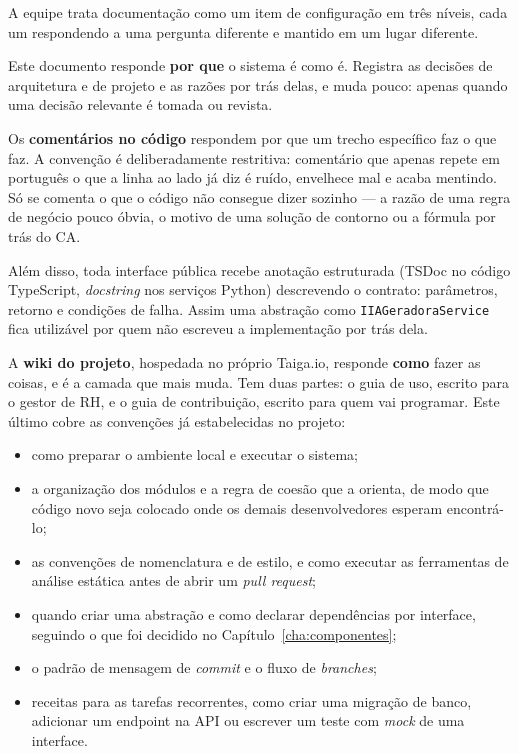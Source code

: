 \documentclass[a4paper,12pt,oneside,openany]{book}
\begin{document}
A equipe trata documentação como um item de configuração em três níveis, cada
um respondendo a uma pergunta diferente e mantido em um lugar diferente.

Este documento responde \textbf{por que} o sistema é como é. Registra as
decisões de arquitetura e de projeto e as razões por trás delas, e muda pouco:
apenas quando uma decisão relevante é tomada ou revista.

Os \textbf{comentários no código} respondem por que um trecho específico faz o
que faz. A convenção é deliberadamente restritiva: comentário que apenas repete
em português o que a linha ao lado já diz é ruído, envelhece mal e acaba
mentindo. Só se comenta o que o código não consegue dizer sozinho --- a razão
de uma regra de negócio pouco óbvia, o motivo de uma solução de contorno ou a
fórmula por trás do CA.

Além disso, toda interface pública recebe anotação estruturada (TSDoc no código
TypeScript, \textit{docstring} nos serviços Python) descrevendo o contrato:
parâmetros, retorno e condições de falha. Assim uma abstração como
\texttt{IIAGeradoraService} fica utilizável por quem não escreveu a
implementação por trás dela.

A \textbf{wiki do projeto}, hospedada no próprio Taiga.io, responde
\textbf{como} fazer as coisas, e é a camada que mais muda. Tem duas partes: o
guia de uso, escrito para o gestor de RH, e o guia de contribuição, escrito
para quem vai programar. Este último cobre as convenções já estabelecidas no
projeto:

\begin{itemize}[nosep]
    \item como preparar o ambiente local e executar o sistema;
    \item a organização dos módulos e a regra de coesão que a orienta, de modo
    que código novo seja colocado onde os demais desenvolvedores esperam
    encontrá-lo;
    \item as convenções de nomenclatura e de estilo, e como executar as
    ferramentas de análise estática antes de abrir um \textit{pull request};
    \item quando criar uma abstração e como declarar dependências por
    interface, seguindo o que foi decidido no Capítulo~\ref{cha:componentes};
    \item o padrão de mensagem de \textit{commit} e o fluxo de
    \textit{branches};
    \item receitas para as tarefas recorrentes, como criar uma migração de
    banco, adicionar um endpoint na API ou escrever um teste com \textit{mock}
    de uma interface.
\end{itemize}
\end{document}
